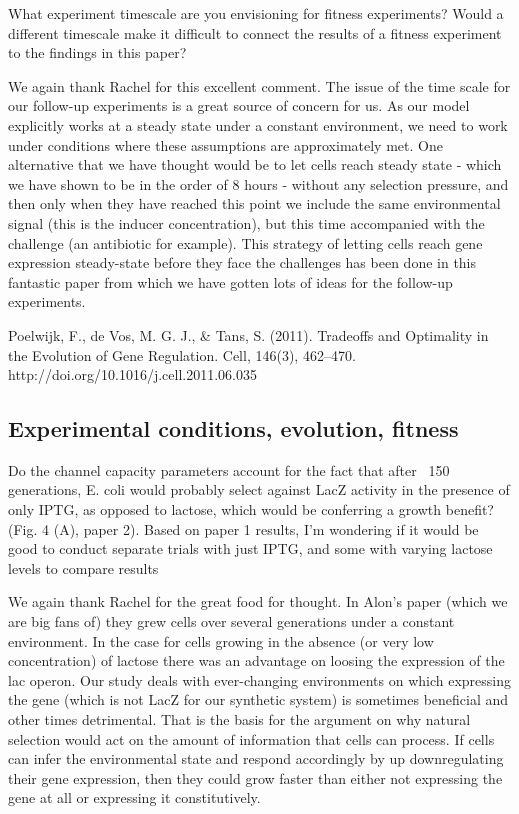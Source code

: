 \begin{tcolorbox}
What experiment timescale are you envisioning for fitness experiments? Would a
different timescale make it difficult to connect the results of a fitness
experiment to the findings in this paper?
\end{tcolorbox}
We again thank Rachel for this excellent comment. The issue of the time scale
for our follow-up experiments is a great source of concern for us. As our model
explicitly works at a steady state under a constant environment, we need to
work under conditions where these assumptions are approximately met. One
alternative that we have thought would be to let cells reach steady state -
which we have shown to be in the order of 8 hours - without any selection
pressure, and then only when they have reached this point we include the same
environmental signal (this is the inducer concentration), but this time
accompanied with the challenge (an antibiotic for example). This strategy of
letting cells reach gene expression steady-state before they face the challenges
has been done in this fantastic paper from which we have gotten lots of ideas
for the follow-up experiments.

Poelwijk, F., de Vos, M. G. J., \& Tans, S. (2011). Tradeoffs and Optimality in
the Evolution of Gene Regulation. Cell, 146(3), 462–470.
http://doi.org/10.1016/j.cell.2011.06.035

\subsection{Experimental conditions, evolution, fitness}

\begin{tcolorbox}
Do the channel capacity parameters account for the fact that after ~150
generations, E. coli would probably select against LacZ activity in the presence
of only IPTG, as opposed to lactose, which would be conferring a growth benefit?
(Fig. 4 (A), paper 2). Based on paper 1 results, I’m wondering if it would be
good to conduct separate trials with just IPTG, and some with varying lactose
levels to compare results
\end{tcolorbox}
We again thank Rachel for the great food for thought. In Alon's paper (which we
are big fans of) they grew cells over several generations under a constant
environment. In the case for cells growing in the absence (or very low
concentration) of lactose there was an advantage on loosing the expression of
the lac operon. Our study deals with ever-changing environments on which
expressing the gene (which is not LacZ for our synthetic system) is sometimes
beneficial and other times detrimental. That is the basis for the argument on
why natural selection would act on the amount of information that cells can
process. If cells can infer the environmental state and respond accordingly by
up downregulating their gene expression, then they could grow faster than either
not expressing the gene at all or expressing it constitutively.

